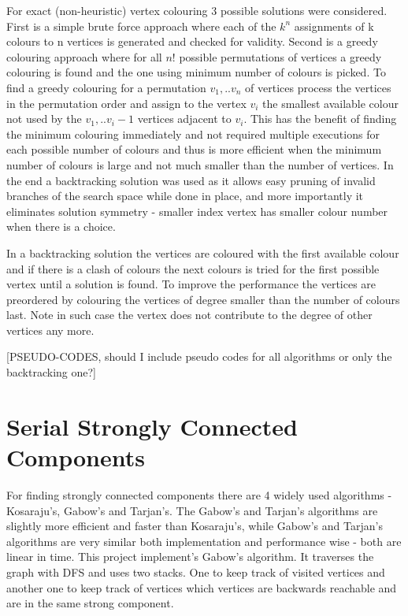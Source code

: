 \documentclass{report}
\theoremstyle{plain}
\theoremstyle{definition}
\theoremstyle{remark}
\begin{document}
For exact (non-heuristic) vertex colouring 3 possible solutions were considered. First is a simple brute force approach where each of the $k^n$ assignments of k colours to n vertices is generated and checked for validity. Second is a greedy colouring approach where for all $n!$ possible permutations of vertices a greedy colouring is found and the one using minimum number of colours is picked. To find a greedy colouring for a permutation $v_1,..v_n$ of vertices process the vertices in the permutation order and assign to the vertex $v_i$ the smallest available colour not used by the $v_1,..v_i-1$ vertices adjacent to $v_i$. This has the benefit of finding the minimum colouring immediately and not required multiple executions for each possible number of colours and thus is more efficient when the minimum number of colours is large and not much smaller than the number of vertices. In the end a backtracking solution was used as it allows easy pruning of invalid branches of the search space while done in place, and more importantly it eliminates solution symmetry - smaller index vertex has smaller colour number when there is a choice.

In a backtracking solution the vertices are coloured with the first available colour and if there is a clash of colours the next colours is tried for the first possible vertex until a solution is found. To improve the performance the vertices are preordered by colouring the vertices of degree smaller than the number of colours last. Note in such case the vertex does not contribute to the degree of other vertices any more.

[PSEUDO-CODES, should I include pseudo codes for all algorithms or only the backtracking one?]

\section{Serial Strongly Connected Components}

For finding strongly connected components there are 4 widely used algorithms - Kosaraju's, Gabow's and Tarjan's. The Gabow's and Tarjan's algorithms are slightly more efficient and faster than Kosaraju's, while Gabow's and Tarjan's algorithms are very similar both implementation and performance wise - both are linear in time. This project implement's Gabow's algorithm. It traverses the graph with DFS and uses two stacks. One to keep track of visited vertices and another one to keep track of vertices which vertices are backwards reachable and are in the same strong component.
\end{document}
